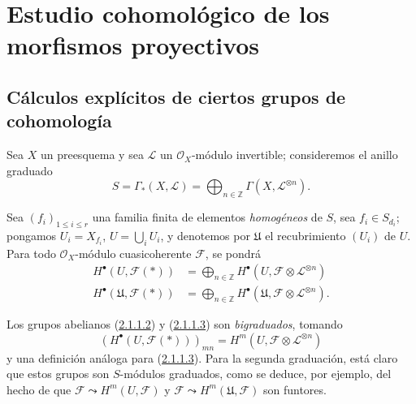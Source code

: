 \section{Estudio cohomológico de los morfismos proyectivos}
\label{section:III.2}
\label{section:III.2-fr}


\subsection{Cálculos explícitos de ciertos grupos de cohomología}
\label{subsection:III.2.1}
\label{subsection:III.2.1-fr}

\begin{env}[2.1.1]
\label{III.2.1.1}
\label{III.2.1.1-fr}

Sea $X$ un preesquema y sea $\mathcal L$ un $\mathcal O_X$-módulo invertible; consideremos el anillo graduado 
\begin{equation}
\label{III.2.1.1.1-fr}
\tag{2.1.1.1}
S=\Gamma_*(X,\mathcal L)
=\bigoplus_{n\in\mathbb Z}\Gamma(X,\mathcal L^{\otimes n}).
\end{equation}

Sea $(f_i)_{1\leq i\leq r}$ una familia finita de elementos \emph{homogéneos} de $S$, sea $f_i\in S_{d_i}$; pongamos $U_i=X_{f_i}$, $U=\bigcup_iU_i$, y denotemos por $\mathfrak U$ el recubrimiento $(U_i)$ de $U$.
Para todo $\mathcal O_X$-módulo cuasicoherente $\mathcal F$, se pondrá
\begin{align}
\label{III.2.1.1.2-fr}
\tag{2.1.1.2}
H^\bullet(U,\mathcal F(*))
&=\bigoplus_{n\in\mathbb Z}
H^\bullet(U,\mathcal F\otimes\mathcal L^{\otimes n})\\
\label{III.2.1.1.3-fr}
\tag{2.1.1.3}
H^\bullet(\mathfrak U,\mathcal F(*))
&=\bigoplus_{n\in\mathbb Z}
H^\bullet(\mathfrak U,\mathcal F\otimes\mathcal L^{\otimes n}).
\end{align}

Los grupos abelianos (\hyperref[III.2.1.1.2-fr]{2.1.1.2}) y
(\hyperref[III.2.1.1.3-fr]{2.1.1.3}) son \emph{bigraduados}, tomando
\[
(H^\bullet(U,\mathcal F(*)))_{mn}
=H^m(U,\mathcal F\otimes\mathcal L^{\otimes n})
\]
y una definición análoga para (\hyperref[III.2.1.1.3]{2.1.1.3}).
Para la segunda graduación, está claro que estos grupos son $S$-módulos graduados, como se deduce, por ejemplo, del hecho de que $\mathcal F\leadsto H^m(U,\mathcal F)$ y $\mathcal F\leadsto H^m(\mathfrak U,\mathcal F)$ son funtores.
\end{env}

